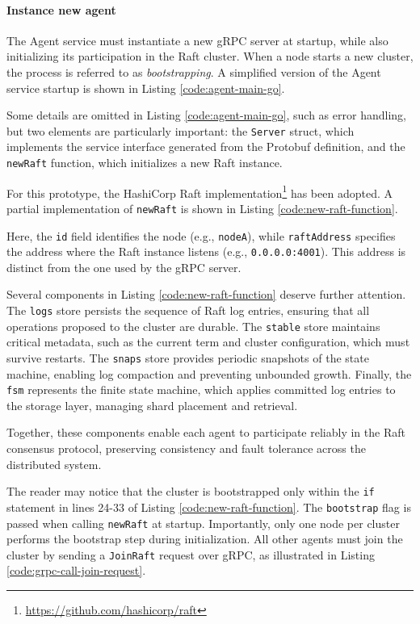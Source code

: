 \paragraph{Instance new agent}

The Agent service must instantiate a new gRPC server at startup, while also initializing its participation in the Raft cluster. When a node starts a new cluster, the process is referred to as \emph{bootstrapping}. A simplified version of the Agent service startup is shown in Listing \ref{code:agent-main-go}.

Some details are omitted in Listing \ref{code:agent-main-go}, such as error handling, but two elements are particularly important:
the \texttt{Server} struct, which implements the service interface generated from the Protobuf definition, and the \texttt{newRaft} function, which initializes a new Raft instance.  

For this prototype, the HashiCorp Raft implementation\footnote{\url{https://github.com/hashicorp/raft}} has been adopted. A partial implementation of \texttt{newRaft} is shown in Listing \ref{code:new-raft-function}.

Here, the \texttt{id} field identifies the node (e.g., \texttt{nodeA}), while \texttt{raftAddress} specifies the address where the Raft instance listens (e.g., \texttt{0.0.0.0:4001}). This address is distinct from the one used by the gRPC server.

Several components in Listing \ref{code:new-raft-function} deserve further attention.  
The \texttt{logs} store persists the sequence of Raft log entries, ensuring that all operations proposed to the cluster are durable. The \texttt{stable} store maintains critical metadata, such as the current term and cluster configuration, which must survive restarts. The \texttt{snaps} store provides periodic snapshots of the state machine, enabling log compaction and preventing unbounded growth. Finally, the \texttt{fsm} represents the finite state machine, which applies committed log entries to the storage layer, managing shard placement and retrieval.  

Together, these components enable each agent to participate reliably in the Raft consensus protocol, preserving consistency and fault tolerance across the distributed system.

The reader may notice that the cluster is bootstrapped only within the
\texttt{if} statement in lines 24-33 of Listing \ref{code:new-raft-function}.
The \texttt{bootstrap} flag is passed when calling \texttt{newRaft} at startup.
Importantly, only one node per cluster performs the bootstrap step during
initialization. All other agents must join the cluster by sending a \texttt{JoinRaft} request over gRPC, as illustrated in Listing \ref{code:grpc-call-join-request}.


